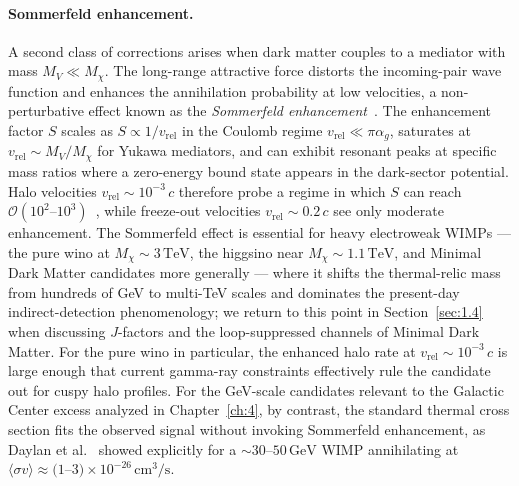 \paragraph{Sommerfeld enhancement.}
A second class of corrections arises when dark matter couples to a mediator with mass $M_V \ll M_\chi$.
The long-range attractive force distorts the incoming-pair wave function and enhances the annihilation probability at low velocities, a non-perturbative effect known as the \emph{Sommerfeld enhancement}~\cite{Hisano:2004ds,ArkaniHamed:2008qn}.
The enhancement factor $S$ scales as $S\propto 1/v_\mathrm{rel}$ in the Coulomb regime $v_\mathrm{rel} \ll \pi\alpha_g$, saturates at $v_\mathrm{rel}\sim M_V/M_\chi$ for Yukawa mediators, and can exhibit resonant peaks at specific mass ratios where a zero-energy bound state appears in the dark-sector potential.
Halo velocities $v_\mathrm{rel}\sim 10^{-3}\,c$ therefore probe a regime in which $S$ can reach $\mathcal{O}(10^2\text{--}10^3)$~\cite{Hisano:2004ds}, while freeze-out velocities $v_\mathrm{rel}\sim 0.2\,c$ see only moderate enhancement.
The Sommerfeld effect is essential for heavy electroweak WIMPs --- the pure wino at $M_\chi\sim 3\,\mathrm{TeV}$, the higgsino near $M_\chi\sim 1.1\,\mathrm{TeV}$, and Minimal Dark Matter candidates more generally --- where it shifts the thermal-relic mass from hundreds of GeV to multi-TeV scales and dominates the present-day indirect-detection phenomenology; we return to this point in Section~\ref{sec:1.4} when discussing $J$-factors and the loop-suppressed channels of Minimal Dark Matter.
For the pure wino in particular, the enhanced halo rate at $v_\mathrm{rel}\sim 10^{-3}\,c$ is large enough that current gamma-ray constraints effectively rule the candidate out for cuspy halo profiles.
For the GeV-scale candidates relevant to the Galactic Center excess analyzed in Chapter~\ref{ch:4}, by contrast, the standard thermal cross section fits the observed signal without invoking Sommerfeld enhancement, as Daylan et al.~\cite{Daylan:2014rsa} showed explicitly for a $\sim 30$--$50\,\mathrm{GeV}$ WIMP annihilating at $\langle\sigma v\rangle \approx (1$--$3)\times 10^{-26}\,\mathrm{cm}^3/\mathrm{s}$.

